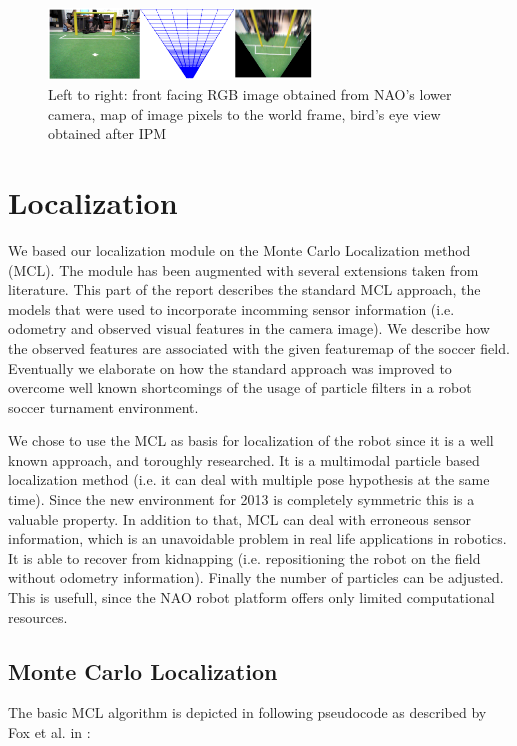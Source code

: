 \documentclass[	DIV=calc,%
							paper=a4,%
							fontsize=9pt,%
							twocolumn]{scrartcl}	 					%
\begin{document}
\begin{figure}
\includegraphics[width = 265px]{figures/imagePixelsMapped.png}
\caption{Left to right: front facing RGB image obtained from NAO's lower camera, map of image pixels to the world frame, bird's eye view obtained after IPM}
\label{fig:IPM}
\end{figure}


\section{Localization}
\label{sec:Localization}
We based our localization module on the Monte Carlo Localization method (MCL). The module has been augmented with several extensions taken from literature. This part of the report describes the standard MCL approach, the models that were used to incorporate incomming sensor information (i.e. odometry and observed visual features in the camera image). We describe how the observed features are associated with the given featuremap of the soccer field. Eventually we elaborate on how the standard approach was improved to overcome well known shortcomings of the usage of particle filters in a robot soccer turnament environment.

We chose to use the MCL as basis for localization of the robot since it is a well known approach, and toroughly researched. It is a multimodal particle based localization method (i.e. it can deal with multiple pose hypothesis at the same time). Since the new environment for 2013 is completely symmetric this is a valuable property. In addition to that, MCL can deal with erroneous sensor information, which is an unavoidable problem in real life applications in robotics. It is able to recover from kidnapping (i.e. repositioning the robot on the field without odometry information). Finally the number of particles can be adjusted. This is usefull, since the NAO robot platform offers only limited computational resources.
\subsection{Monte Carlo Localization}
\label{sec:MCL}
The basic MCL algorithm is depicted in following pseudocode  as described by Fox et al. in \cite{MonteCarloLocalization}:\\
\end{document}
